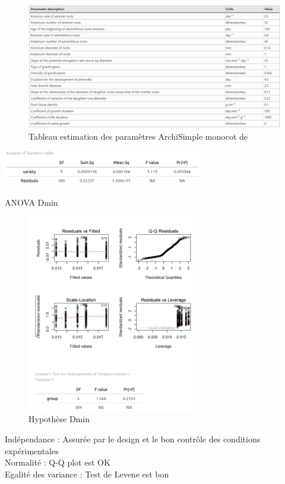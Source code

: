 \newpage

\label{an:Poaceae}
\begin{figure}[ht]
\centering
\includegraphics[width=1\textwidth]{Image/parametre Poaceae.png}
\caption{Tableau estimation des paramètres ArchiSimple monocot de \cite{gerard_modelling_2017}}
\end{figure}

\newpage

\label{an:Dmin}
\begin{table}[ht]
\centering
\includegraphics[width=0.65\textwidth]{Image/anova Dmin.png}
\caption{ANOVA Dmin}
\end{table}
\begin{figure}[ht]
\centering
\includegraphics[width=0.65\textwidth]{Image/hypothese Dmin.png}
\caption{Hypothèse Dmin}
\end{figure}
\noindent Indépendance : Assurée par le design et le bon contrôle des conditions expérimentales \\
Normalité : Q-Q plot est OK \\
Egalité des variance : Test de Levene est bon

